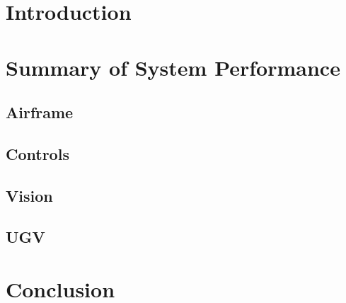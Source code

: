\documentclass[]{auvsi_doc}
\begin{document}
\begin{AUVSITitlePage}
\begin{artifacttable}
\end{artifacttable}
\end{AUVSITitlePage}

\section{Introduction}



\section{Summary of System Performance}



\subsection{Airframe}
\subsection{Controls}
\subsection{Vision}
\subsection{UGV}


\section{Conclusion}
\end{document}
